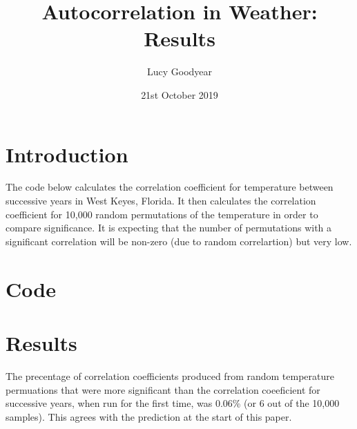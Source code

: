 \documentclass{article}
\title{Autocorrelation in Weather: Results}
\author{Lucy Goodyear}
\date{21st October 2019}
\begin{document}
\maketitle


\section{Introduction}

The code below calculates the correlation coefficient for temperature between successive years in West Keyes, Florida. It then calculates the correlation coefficient for 10,000 random permutations of the temperature in order to compare significance. It is expecting that the number of permutations with a significant correlation will be non-zero (due to random correlartion) but very low.

\section{Code}

\section{Results}

The precentage of correlation coefficients produced from random temperature permuations that were more significant than the correlation coeeficient for successive years, when run for the first time, was 0.06\% (or 6 out of the 10,000 samples). This agrees with the prediction at the start of this paper.
\end{document}

